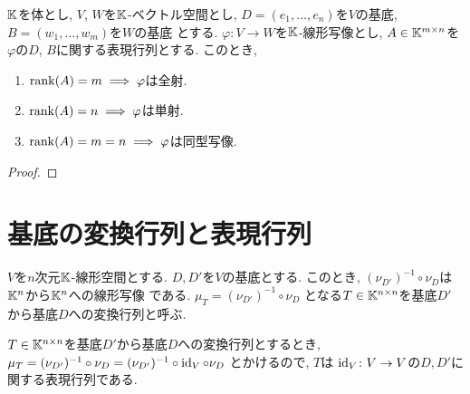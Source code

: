 \begin{prop}
  $\mathbb{K}$を体とし,
  $V$, $W$を$\mathbb{K}$-ベクトル空間とし,
  $D=(e_1,\ldots,e_n)$を$V$の基底,
  $B=(w_1,\ldots,w_m)$を$W$の基底
  とする.
  $\varphi\colon V\to W$を$\mathbb{K}$-線形写像とし,
  $A\in\mathbb{K}^{m\times n}$を$\varphi$の$D$, $B$に関する表現行列とする.
  このとき,
\begin{enumerate}
  \item $\operatorname{rank}(A)=m\implies \varphi$は全射.
  \item $\operatorname{rank}(A)=n\implies \varphi$は単射.
  \item $\operatorname{rank}(A)=m=n\implies \varphi$は同型写像.
\end{enumerate}
\end{prop}
\begin{proof}\end{proof}

\section{基底の変換行列と表現行列}

\begin{definition}
  $V$を$n$次元$\mathbb{K}$-線形空間とする.
  $D,D'$を$V$の基底とする.
  このとき, $(\nu_{D'})^{-1}\circ\nu_{D}$は$\mathbb{K}^n$から$\mathbb{K}^n$への線形写像
  である.
  $\mu_T=(\nu_{D'})^{-1}\circ\nu_{D}$
  となる$T\in\mathbb{K}^{n\times n}$を基底$D'$から基底$D$への変換行列と呼ぶ.
\end{definition}
\begin{remark}
  $T\in\mathbb{K}^{n\times n}$を基底$D'$から基底$D$への変換行列とするとき,
  $\mu_T=(\nu_{D'})^{-1}\circ\nu_{D}=(\nu_{D'})^{-1}\circ\operatorname{id}_{V}\circ\nu_{D}$
  とかけるので,
  $T$は
  $\operatorname{id}_{V}\colon V\to V$の$D,D'$に関する表現行列である.
\end{remark}

